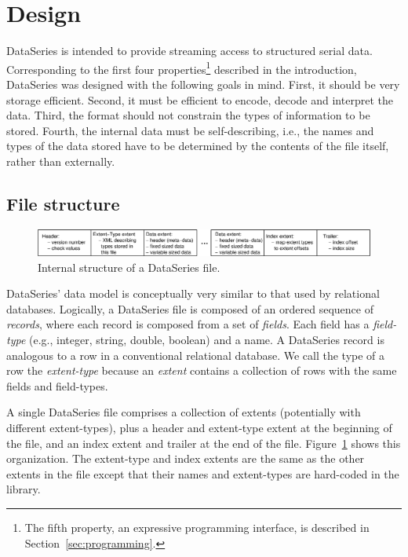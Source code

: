 \section{Design}\label{sec:design}

DataSeries is intended to provide streaming access to structured serial
data. Corresponding
to the first four properties\footnote{The fifth property, an expressive
programming interface, is described in Section~\ref{sec:programming}.}
described in the introduction, DataSeries was designed with the
following goals in mind. First, it should be very storage
efficient. Second, it must be efficient to encode, decode and
interpret the data.  Third, the format should not constrain the
types of information to be stored. Fourth, the internal data must be
self-describing, i.e., the names and types of the data stored have to
be determined by the contents of the file itself, rather than 
externally.

\subsection{File structure}\label{sec:structure}

\begin{figure}
\hfil\includegraphics[width=6.5in]{fig/ds-format2.eps}\hfil
\caption{Internal structure of a DataSeries file. }
\label{fig:dsorg}
\end{figure}

DataSeries' data model is conceptually very similar to that used
by relational databases. 
Logically, a DataSeries file is composed of an ordered sequence of
{\it records}, where each record is composed from a set of {\it
fields}. Each field has a {\it field-type} (e.g., integer, string, double,
boolean) and a name. A DataSeries record is analogous to a row in a
conventional relational database. We call the type of a row 
the {\it extent-type} because 
an {\it extent} contains a collection of rows with the same fields and 
field-types.

A single DataSeries file comprises a
collection of extents (potentially with different extent-types), plus a
header and extent-type extent at the beginning of the file, and an index extent and
trailer at the end of the file. Figure~\ref{fig:dsorg} shows
this organization.  The extent-type and index extents are the same as the
other extents in the file except that their names and extent-types are 
hard-coded in the library.

